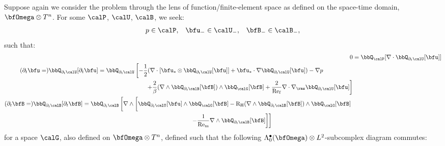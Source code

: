     Suppose again we consider the problem through the lens of function/finite-element space as defined on the space-time domain, $\bfOmega\otimes T^{n}$. For some $\calP$, $\calU$, $\calB$, we seek:
    \begin{align}
        p         \in  \calP,  &&
        \bfu_{-}  \in  \calU_{-},  &&
        \bfB_{-}  \in  \calB_{-},
    \end{align}
    such that:
    \begin{align}
            0
            &=
            \bbQ_{\calP}[\nabla\cdot\bbQ_{\partial_{t}\calU}[\bfu]]  \label{eqn:incompressible MHD weak form 1}  \\
        \begin{split}
            (\partial_{t}\bfu
            =)
            \bbQ_{\partial_{t}\calU}[\partial_{t}\bfu]
            &=
            \bbQ_{\partial_{t}\calU}\left[- \frac{1}{2}(\nabla\cdot\left[\bfu_{*}\otimes\bbQ_{\partial_{t}\calU}[\bfu]\right]
            + \bfu_{*}\cdot\nabla\bbQ_{\partial_{t}\calU}[\bfu])
            - \nabla p\right.  \\
            &\qquad\qquad\qquad\qquad\left.+ \frac{2}{\beta}(\nabla\wedge\bbQ_{\partial_{t}\calB}[\bfB])\wedge\bbQ_{\calG}[\bfB]
            + \frac{2}{\rmRef}\nabla\cdot\nabla_{\rms}\bbQ_{\partial_{t}\calU}[\bfu]\right]
        \end{split}  \\
        \begin{split}
            (\partial_{t}\bfB
            =)
            \bbQ_{\partial_{t}\calB}[\partial_{t}\bfB]
            &=
            \bbQ_{\partial_{t}\calB}\left[\nabla\wedge\left[\bbQ_{\partial_{t}\calU}[\bfu]\wedge\bbQ_{\calG}[\bfB]
            - \rmRH(\nabla\wedge\bbQ_{\partial_{t}\calB}[\bfB])\wedge\bbQ_{\calG}[\bfB]\tall\right.\right.  \\
            &\qquad\qquad\qquad\qquad\qquad\qquad\qquad\qquad\qquad\left.\left.- \frac{1}{\rmRem}\nabla\wedge\bbQ_{\partial_{t}\calB}[\bfB]\right]\right]
        \end{split}
    \end{align}
    for a space $\calG$, also defined on $\bfOmega\otimes T^{n}$, defined such that the following $\Lambda_{0}^{\bullet}(\bfOmega)\otimes L^{2}$-subcomplex diagram commutes:
    \begin{center}\end{center}
